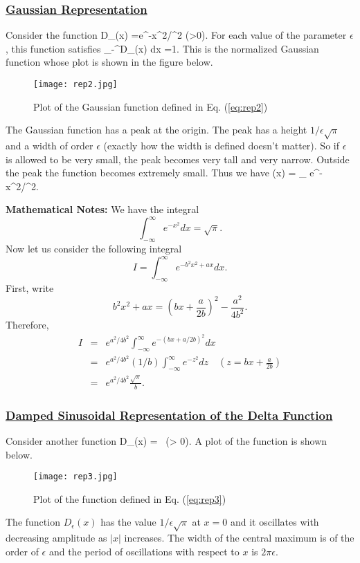 \subsubsection{\underline{Gaussian Representation}}
Consider the function
\be
D_{\epsilon}(x) =e^{-x^2/\epsilon^2} \;\; (\epsilon>0).
\label{eq:rep2}
\ee
For each value of the parameter $\epsilon$, this function satisfies
\be
\int_{-\infty}^{\infty}D_{\epsilon}(x) dx =1.
\ee
This  is the normalized Gaussian function whose plot is shown in the figure below.
\begin{figure}[ht]
\centering
\texttt{[image: rep2.jpg]}
\caption{Plot of the Gaussian function defined in Eq. (\ref{eq:rep2})}
\end{figure}

\noindent
The Gaussian function has a peak at the origin. The peak has a height $1/\epsilon\sqrt{\pi}$ and a width of order $\epsilon$
(exactly how the width is defined doesn't matter). So if $\epsilon$ is allowed to be very small, the peak becomes very tall and very 
narrow. Outside the peak the function becomes extremely small. Thus we have
\be
\delta(x) = \lim_{\epsilon {}}  e^{-x^2/\epsilon^2}.
\ee

\vspace{10 mm}
\noindent
{\bf Mathematical Notes:} \newline
\noindent
We have the integral
\[ \int_{-\infty}^{\infty}e^{-x^2}dx = \sqrt{\pi}. \]
Now let us consider the following integral
\[ I= \int_{-\infty}^{\infty}e^{-b^2x^2+ a x}dx.\]
First, write
\[ b^2x^2+ax = \left(bx+\frac{a}{2b}\right)^2-\frac{a^2}{4b^2} .\]
Therefore,
\begin{eqnarray*}
I & =& e^{a^2/4b^2}\int_{-\infty}^{\infty}e^{-(bx+a/2b)^2}dx \\
& = & e^{a^2/4b^2}(1/b)\int_{-\infty}^{\infty}e^{-z^2}dz \quad (z=bx+\frac{a}{2b}) \\
& = & e^{a^2/4b^2}\frac{\sqrt{\pi}}{b}.
\end{eqnarray*}

\subsubsection{\underline{Damped Sinusoidal Representation of the Delta Function}}
Consider another function
\be
D_{\epsilon}(x) = \, \quad (\epsilon > 0).
\label{eq:rep3}
\ee
A plot of the function is shown below.
\begin{figure}[ht]
\centering
\texttt{[image: rep3.jpg]}
\caption{Plot of the function defined in Eq. (\ref{eq:rep3})}
\end{figure}
The function $D_{\epsilon}(x)$ has the value $1/\epsilon\sqrt{\pi}$ at $x=0$ and it oscillates with decreasing amplitude
as $|x|$ increases. The width of the central maximum is of the order of $\epsilon$ and the period of oscillations with respect to
$x$ is $2\pi \epsilon$.



